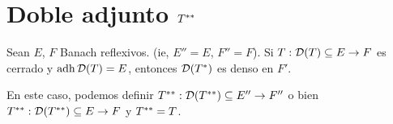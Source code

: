 \newpage
\section{Doble adjunto ${T^{**}} $}

\begin{thm}
Sean $E$, $F$ Banach reflexivos. (ie, $E'' = E$, $F'' = F$). Si $T : \mathcal{D}(T) \subseteq E \to F$ es cerrado y $\operatorname{\mathop{\text{\upshape{adh}}}} \mathcal{D}(T) = E$, entonces $\mathcal{D}(T^{*})$ es denso en $F'$.
\end{thm}

En este caso, podemos definir $T^{**} : \mathcal{D}(T^{**}) \subseteq E'' \to F''$ o bien $T^{**} : \mathcal{D}(T^{**}) \subseteq E \to F$ y $T ^{**} = T$.